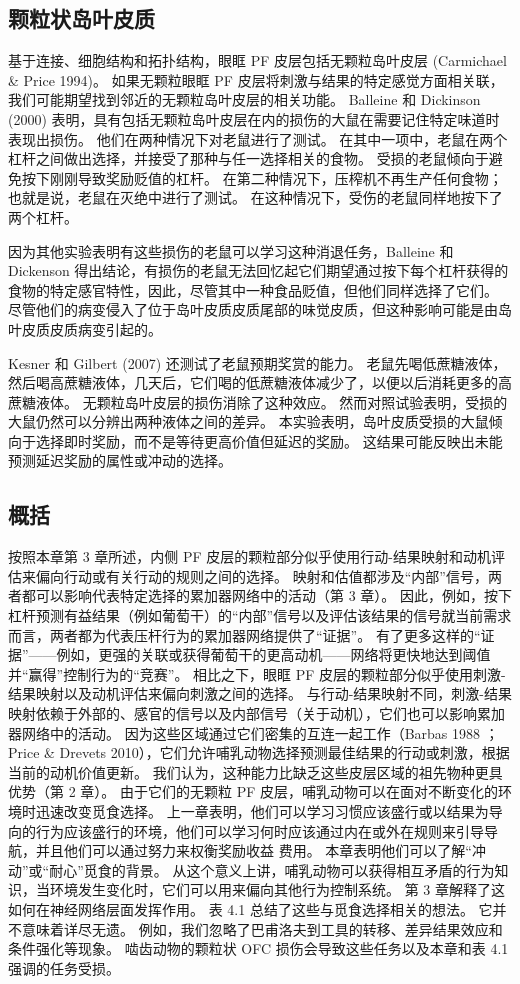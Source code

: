 \subsection{颗粒状岛叶皮质}
基于连接、细胞结构和拓扑结构，眼眶 PF 皮层包括无颗粒岛叶皮层 (Carmichael \& Price 1994)。 如果无颗粒眼眶 PF 皮层将刺激与结果的特定感觉方面相关联，我们可能期望找到邻近的无颗粒岛叶皮层的相关功能。
Balleine 和 Dickinson (2000) 表明，具有包括无颗粒岛叶皮层在内的损伤的大鼠在需要记住特定味道时表现出损伤。 他们在两种情况下对老鼠进行了测试。 在其中一项中，老鼠在两个杠杆之间做出选择，并接受了那种与任一选择相关的食物。 受损的老鼠倾向于避免按下刚刚导致奖励贬值的杠杆。 在第二种情况下，压榨机不再生产任何食物； 也就是说，老鼠在灭绝中进行了测试。 在这种情况下，受伤的老鼠同样地按下了两个杠杆。\par
因为其他实验表明有这些损伤的老鼠可以学习这种消退任务，Balleine 和 Dickenson 得出结论，有损伤的老鼠无法回忆起它们期望通过按下每个杠杆获得的食物的特定感官特性，因此，尽管其中一种食品贬值，但他们同样选择了它们。 尽管他们的病变侵入了位于岛叶皮质皮质尾部的味觉皮质，但这种影响可能是由岛叶皮质皮质病变引起的。\par
Kesner 和 Gilbert (2007) 还测试了老鼠预期奖赏的能力。 老鼠先喝低蔗糖液体，然后喝高蔗糖液体，几天后，它们喝的低蔗糖液体减少了，以便以后消耗更多的高蔗糖液体。 无颗粒岛叶皮层的损伤消除了这种效应。 然而对照试验表明，受损的大鼠仍然可以分辨出两种液体之间的差异。 本实验表明，岛叶皮质受损的大鼠倾向于选择即时奖励，而不是等待更高价值但延迟的奖励。 这结果可能反映出未能预测延迟奖励的属性或冲动的选择。\par
\subsection{概括}
按照本章第 3 章所述，内侧 PF 皮层的颗粒部分似乎使用行动-结果映射和动机评估来偏向行动或有关行动的规则之间的选择。 映射和估值都涉及“内部”信号，两者都可以影响代表特定选择的累加器网络中的活动（第 3 章）。 因此，例如，按下杠杆预测有益结果（例如葡萄干）的“内部”信号以及评估该结果的信号就当前需求而言，两者都为代表压杆行为的累加器网络提供了“证据”。 有了更多这样的“证据”——例如，更强的关联或获得葡萄干的更高动机——网络将更快地达到阈值并“赢得”控制行为的“竞赛”。
相比之下，眼眶 PF 皮层的颗粒部分似乎使用刺激-结果映射以及动机评估来偏向刺激之间的选择。 与行动-结果映射不同，刺激-结果映射依赖于外部的、感官的信号以及内部信号（关于动机），它们也可以影响累加器网络中的活动。
因为这些区域通过它们密集的互连一起工作（Barbas 1988 ；Price \& Drevets 2010），它们允许哺乳动物选择预测最佳结果的行动或刺激，根据当前的动机价值更新。
我们认为，这种能力比缺乏这些皮层区域的祖先物种更具优势（第 2 章）。 由于它们的无颗粒 PF 皮层，哺乳动物可以在面对不断变化的环境时迅速改变觅食选择。 上一章表明，他们可以学习习惯应该盛行或以结果为导向的行为应该盛行的环境，他们可以学习何时应该通过内在或外在规则来引导导航，并且他们可以通过努力来权衡奖励收益 费用。 本章表明他们可以了解“冲动”或“耐心”觅食的背景。
从这个意义上讲，哺乳动物可以获得相互矛盾的行为知识，当环境发生变化时，它们可以用来偏向其他行为控制系统。 第 3 章解释了这如何在神经网络层面发挥作用。 表 4.1 总结了这些与觅食选择相关的想法。 它并不意味着详尽无遗。 例如，我们忽略了巴甫洛夫到工具的转移、差异结果效应和条件强化等现象。 啮齿动物的颗粒状 OFC 损伤会导致这些任务以及本章和表 4.1 强调的任务受损。

